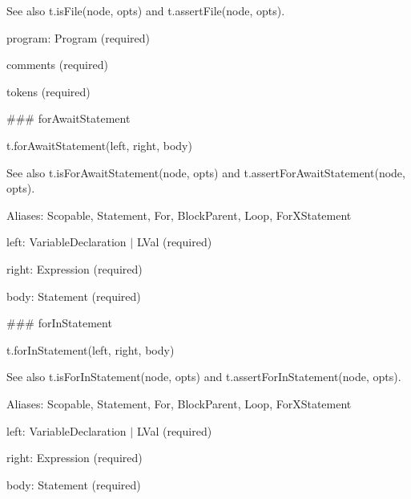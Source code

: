 See also {\ttfamily t.\+is\+File(node, opts)} and {\ttfamily t.\+assert\+File(node, opts)}.


\begin{DoxyItemize}
\item {\ttfamily program}\+: {\ttfamily Program} (required)
\item {\ttfamily comments} (required)
\item {\ttfamily tokens} (required) 


\end{DoxyItemize}

\#\#\# for\+Await\+Statement 
\begin{DoxyCode}
t.forAwaitStatement(left, right, body)
\end{DoxyCode}


See also {\ttfamily t.\+is\+For\+Await\+Statement(node, opts)} and {\ttfamily t.\+assert\+For\+Await\+Statement(node, opts)}.

Aliases\+: {\ttfamily Scopable}, {\ttfamily Statement}, {\ttfamily For}, {\ttfamily Block\+Parent}, {\ttfamily Loop}, {\ttfamily For\+X\+Statement}


\begin{DoxyItemize}
\item {\ttfamily left}\+: {\ttfamily Variable\+Declaration $\vert$ L\+Val} (required)
\item {\ttfamily right}\+: {\ttfamily Expression} (required)
\item {\ttfamily body}\+: {\ttfamily Statement} (required) 


\end{DoxyItemize}

\#\#\# for\+In\+Statement 
\begin{DoxyCode}
t.forInStatement(left, right, body)
\end{DoxyCode}


See also {\ttfamily t.\+is\+For\+In\+Statement(node, opts)} and {\ttfamily t.\+assert\+For\+In\+Statement(node, opts)}.

Aliases\+: {\ttfamily Scopable}, {\ttfamily Statement}, {\ttfamily For}, {\ttfamily Block\+Parent}, {\ttfamily Loop}, {\ttfamily For\+X\+Statement}


\begin{DoxyItemize}
\item {\ttfamily left}\+: {\ttfamily Variable\+Declaration $\vert$ L\+Val} (required)
\item {\ttfamily right}\+: {\ttfamily Expression} (required)
\item {\ttfamily body}\+: {\ttfamily Statement} (required) 


\end{DoxyItemize}

